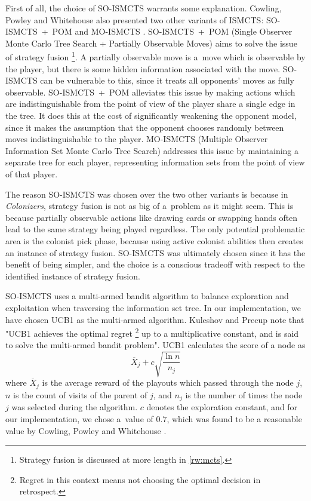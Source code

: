 First of all, the choice of SO-ISMCTS warrants some explanation. Cowling, Powley
and Whitehouse also presented two other variants of ISMCTS: SO-ISMCTS~+~POM and
MO-ISMCTS \cite{Cowling12}. SO-ISMCTS~+~POM (Single Observer Monte Carlo
Tree Search + Partially Observable Moves) aims to solve the issue of
strategy fusion
\footnote{Strategy fusion is discussed at more length in \autoref{rw:mcts}.}.
A partially observable move is a~move which is observable by the player, but there
is some hidden information associated with the move.
SO-ISMCTS can be vulnerable to this, since it treats all
opponents' moves as fully observable. SO-ISMCTS~+~POM alleviates this issue
by making actions which are indistinguishable from the point of view of the player
share a single edge in the tree. It does this at the cost of significantly weakening
the opponent model, since it makes the assumption that the opponent chooses randomly
between moves indistinguishable to the player. MO-ISMCTS (Multiple Observer Information
Set Monte Carlo Tree Search) addresses this issue by maintaining a separate tree
for each player, representing information sets from the point of view of that player.

The reason SO-ISMCTS was chosen over the two other variants is because in \emph{Colonizers},
strategy fusion is not as big of a~problem as it might seem. This is because
partially observable actions like drawing cards or swapping hands often lead to the
same strategy being played regardless. The only potential problematic area
is the colonist pick phase, because using active colonist abilities then
creates an instance of strategy fusion. SO-ISMCTS was ultimately chosen
since it has the benefit of being simpler, and the choice is a conscious
tradeoff with respect to the identified instance of strategy fusion.

SO-ISMCTS uses a multi-armed bandit algorithm to balance exploration
and exploitation when traversing the information set tree.
In our implementation, we have chosen UCB1 as the multi-armed algorithm.
Kuleshov and Precup \cite{Kuleshov00} note that "UCB1 achieves the optimal regret
\footnote{Regret in this context means not choosing the optimal decision in
retrospect.} up to a
multiplicative constant, and is said to solve the multi-armed bandit problem".
UCB1 calculates the score of a node as
$$\overline{X}_{j} + c\sqrt{\frac{\ln{n}}{n_{j}}}$$
where $\overline{X}_{j}$ is the average reward of the playouts which passed through
the node $j$, $n$ is the count of visits of the parent of $j$, and $n_{j}$
is the number of times the node $j$ was selected during the algorithm.
$c$ denotes the exploration constant, and for our implementation, we chose a~value
of $0.7$, which was found to be a reasonable value by Cowling, Powley and Whitehouse
\cite{Cowling12}.

